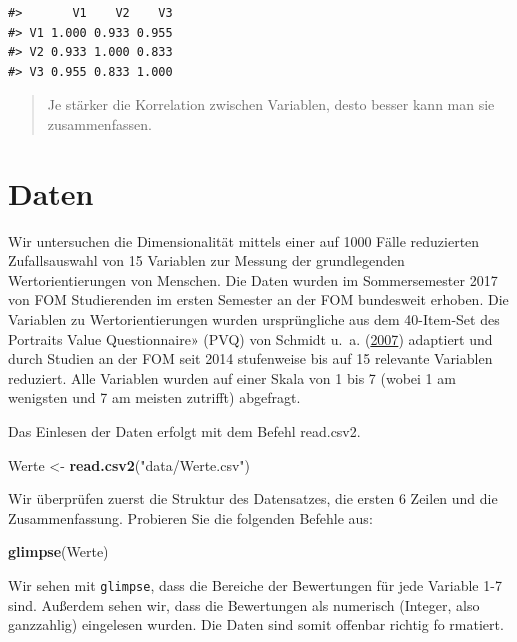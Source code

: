 \documentclass[12pt,ngerman,]{book}
\makeatletter
\newenvironment{Shaded}{\begin{snugshade}}{\end{snugshade}}
\newcommand{\KeywordTok}[1]{\textcolor[rgb]{0.13,0.29,0.53}{\textbf{{#1}}}}
\newcommand{\StringTok}[1]{\textcolor[rgb]{0.31,0.60,0.02}{{#1}}}
\newcommand{\NormalTok}[1]{{#1}}
\newenvironment{kframe}{%
\medskip{}
\setlength{\fboxsep}{.8em}
 \def\at@end@of@kframe{}%
 \ifinner\ifhmode%
  \def\at@end@of@kframe{\end{minipage}}%
  \begin{minipage}{\columnwidth}%
 \fi\fi%
 \def\FrameCommand##1{\hskip\@totalleftmargin \hskip-\fboxsep
 \colorbox{shadecolor}{##1}\hskip-\fboxsep
     \hskip-\linewidth \hskip-\@totalleftmargin \hskip\columnwidth}%
 \MakeFramed {\advance\hsize-\width
   \@totalleftmargin\z@ \linewidth\hsize
   \@setminipage}}%
 {\par\unskip\endMakeFramed%
 \at@end@of@kframe}
\renewenvironment{Shaded}{\begin{kframe}}{\end{kframe}}
\theoremstyle{definition}
\theoremstyle{definition}
\theoremstyle{remark}
\makeatother
\begin{document}
\begin{verbatim}
#>       V1    V2    V3
#> V1 1.000 0.933 0.955
#> V2 0.933 1.000 0.833
#> V3 0.955 0.833 1.000
\end{verbatim}

\begin{quote}
Je stärker die Korrelation zwischen Variablen, desto besser kann man sie
zusammenfassen.
\end{quote}

\section{Daten}\label{daten-1}

Wir untersuchen die Dimensionalität mittels einer auf 1000 Fälle
reduzierten Zufallsauswahl von 15 Variablen zur Messung der
grundlegenden Wertorientierungen von Menschen. Die Daten wurden im
Sommersemester 2017 von FOM Studierenden im ersten Semester an der FOM
bundesweit erhoben. Die Variablen zu Wertorientierungen wurden
ursprüngliche aus dem 40-Item-Set des Portraits Value Questionnaire»
(PVQ) von Schmidt u.~a. (\protect\hyperlink{ref-Schmidt2007}{2007})
adaptiert und durch Studien an der FOM seit 2014 stufenweise bis auf 15
relevante Variablen reduziert. Alle Variablen wurden auf einer Skala von
1 bis 7 (wobei 1 am wenigsten und 7 am meisten zutrifft) abgefragt.

Das Einlesen der Daten erfolgt mit dem Befehl read.csv2.

\begin{Shaded}
\begin{Highlighting}[]
\NormalTok{Werte <-}\StringTok{ }\KeywordTok{read.csv2}\NormalTok{(}\StringTok{"data/Werte.csv"}\NormalTok{)}
\end{Highlighting}
\end{Shaded}

Wir überprüfen zuerst die Struktur des Datensatzes, die ersten 6 Zeilen
und die Zusammenfassung. Probieren Sie die folgenden Befehle aus:

\begin{Shaded}
\begin{Highlighting}[]
\KeywordTok{glimpse}\NormalTok{(Werte)}
\end{Highlighting}
\end{Shaded}

Wir sehen mit \texttt{glimpse}, dass die Bereiche der Bewertungen für
jede Variable 1-7 sind. Außerdem sehen wir, dass die Bewertungen als
numerisch (Integer, also ganzzahlig) eingelesen wurden. Die Daten sind
somit offenbar richtig fo rmatiert.
\end{document}
